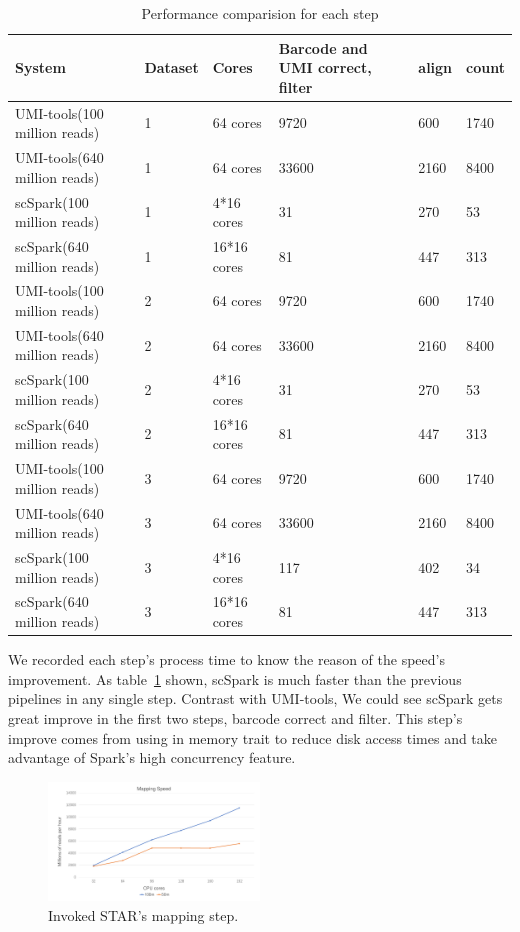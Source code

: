 \documentclass[10pt,journal,compsoc]{IEEEtran}
\begin{document}
\begin{table}
	\centering
	\caption{Performance comparision for each step}\label{tab2}
	\resizebox{0.45\textwidth}{!} {
	\begin{tabular}{l | l | l | l | l | l}
		\hline
		System & Dataset & Cores & Barcode and UMI correct, filter & align & count \\
		\hline
		UMI-tools(100 million reads) & 1 & 64 cores & 9720 & 600 & 1740 \\
		UMI-tools(640 million reads) & 1 & 64 cores & 33600 & 2160 & 8400 \\
		scSpark(100 million reads) & 1 & 4*16 cores & 31 & 270 & 53 \\
		scSpark(640 million reads) & 1 & 16*16 cores & 81 & 447 & 313 \\
		UMI-tools(100 million reads) & 2 & 64 cores & 9720 & 600 & 1740 \\
		UMI-tools(640 million reads) & 2 & 64 cores & 33600 & 2160 & 8400 \\
		scSpark(100 million reads) & 2 & 4*16 cores & 31 & 270 & 53 \\
		scSpark(640 million reads) & 2 & 16*16 cores & 81 & 447 & 313 \\
		UMI-tools(100 million reads) & 3 & 64 cores & 9720 & 600 & 1740 \\
		UMI-tools(640 million reads) & 3 & 64 cores & 33600 & 2160 & 8400 \\
		scSpark(100 million reads) & 3 & 4*16 cores & 117 & 402 & 34 \\
		scSpark(640 million reads) & 3 & 16*16 cores & 81 & 447 & 313 \\
		\hline
	\end{tabular} }
\end{table}
We recorded each step's process time to know the reason of the speed's improvement.
As table~\ref{tab2} shown, scSpark is much faster than the previous pipelines in any single step.
Contrast with UMI-tools, We could see scSpark gets great improve in the first two steps, barcode correct and filter.
This step's improve comes from using in memory trait to reduce disk access times and take advantage of Spark's high concurrency feature.
\begin{figure}
	\includegraphics[width=0.5\textwidth]{fig6.pdf}
	\caption{Invoked STAR's mapping step.} \label{fig6}
\end{figure}
\end{document}
